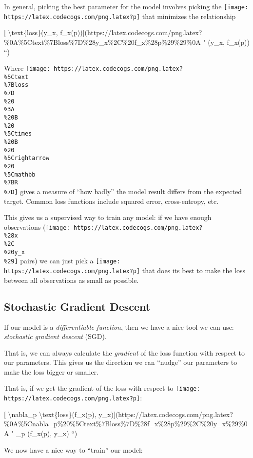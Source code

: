 \documentclass[]{article}
\begin{document}
In general, picking the best parameter for the model involves picking the
\texttt{[image: https://latex.codecogs.com/png.latex?p]} that minimizes the
relationship

{[} \textbackslash{}text\{loss\}(y\_x,
f\_x(p)){]}(https://latex.codecogs.com/png.latex?\%0A\%5Ctext\%7Bloss\%7D\%28y\_x\%2C\%20f\_x\%28p\%29\%29\%0A
" (y\_x, f\_x(p)) ``)

Where
\texttt{[image: https://latex.codecogs.com/png.latex?\\\%5Ctext\\\%7Bloss\\\%7D\\\%20\\\%3A\\\%20B\\\%20\\\%5Ctimes\\\%20B\\\%20\\\%5Crightarrow\\\%20\\\%5Cmathbb\\\%7BR\\\%7D]}
gives a measure of ``how badly'' the model result differs from the expected
target. Common loss functions include squared error, cross-entropy, etc.

This gives us a supervised way to train any model: if we have enough
observations
(\texttt{[image: https://latex.codecogs.com/png.latex?\\\%28x\\\%2C\\\%20y\_x\\\%29]}
pairs) we can just pick a
\texttt{[image: https://latex.codecogs.com/png.latex?p]} that does its best to
make the loss between all observations as small as possible.

\hypertarget{stochastic-gradient-descent}{%
\subsection{Stochastic Gradient Descent}\label{stochastic-gradient-descent}}

If our model is a \emph{differentiable function}, then we have a nice tool we
can use: \emph{stochastic gradient descent} (SGD).

That is, we can always calculate the \emph{gradient} of the loss function with
respect to our parameters. This gives us the direction we can ``nudge'' our
parameters to make the loss bigger or smaller.

That is, if we get the gradient of the loss with respect to
\texttt{[image: https://latex.codecogs.com/png.latex?p]}:

{[} \textbackslash{}nabla\_p \textbackslash{}text\{loss\}(f\_x(p),
y\_x){]}(https://latex.codecogs.com/png.latex?\%0A\%5Cnabla\_p\%20\%5Ctext\%7Bloss\%7D\%28f\_x\%28p\%29\%2C\%20y\_x\%29\%0A
" \nabla\_p (f\_x(p), y\_x) ``)

We now have a nice way to ``train'' our model:
\end{document}
